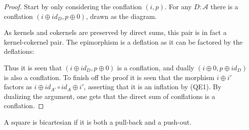     \begin{proof}
        Start by only considering the conflation $(i,p)$. For any $D:\mathcal{A}$ there is a conflation $(i\oplus id_D, p\oplus 0)$, drawn as the diagram.
        \begin{center}
        \end{center}
        As kernels and cokernels are preserved by direct sums, this pair is in fact a kernel-cokernel pair. The epimorphism is a deflation as it can be factored by the deflations:
        \begin{center}
        \end{center}
        Thus it is seen that $(i\oplus id_D, p\oplus 0)$ is a conflation, and dually $(i\oplus 0, p\oplus id_D)$ is also a conflation. To finish off the proof it is seen that the morphism $i\oplus i'$ factors as $i\oplus id_{A'}\circ id_A\oplus i'$, asserting that it is an inflation by (QE1). By dualizing the argument, one gets that the direct sum of conflations is a conflation.
    \end{proof}

    \begin{definition}
        A square is bicartesian if it is both a pull-back and a push-out.
    \end{definition}

